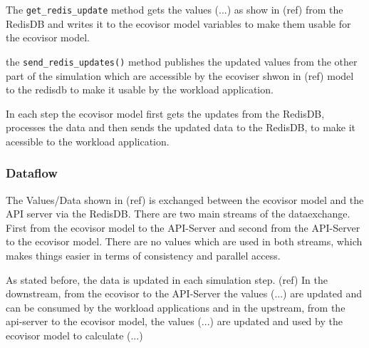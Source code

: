 The \texttt{get\_redis\_update} method gets the values (...) as show in (ref) from the RedisDB %
and writes it to the ecovisor model variables to make them usable for the ecovisor model.

the \texttt{send\_redis\_updates()} method publishes the updated values from the other part of the simulation which are accessible by the ecoviser shwon in (ref) model to the redisdb to make it
usable by the workload application. %

In each step the ecovisor model first gets the updates from the RedisDB, processes the data and then sends the updated data to the RedisDB, to make it
acessible to the workload application.

\subsubsection{Dataflow}
\label{subsec:dataflow}

The Values/Data shown in (ref) is exchanged between the ecovisor model and the API server via the RedisDB. There are two main streams of the dataexchange.
First from the ecovisor model to the API-Server and second from the API-Server to the ecovisor model. There are no values which are used in both streams, which makes things
easier in terms of consistency and parallel access.

As stated before, the data is updated in each simulation step. (ref)
In the downstream, from the ecovisor to the API-Server the values (...) are updated and can be consumed by the workload applications
and in the upstream, from the api-server to the ecovisor model, the values (...) are updated and used by the ecovisor model to calculate (...) %

